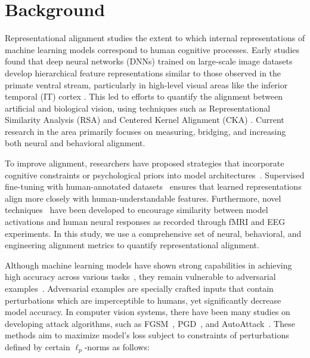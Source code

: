 \section{Background}\label{sec:background}
Representational alignment studies the extent to which internal representations of machine learning models correspond to human cognitive processes. 
Early studies found that deep neural networks (DNNs) trained on large-scale image datasets develop hierarchical feature representations similar to those observed in the primate ventral stream, particularly in high-level visual areas like the inferior temporal (IT) cortex \cite{yamins_hierarchical_2013, schrimpf_brain-score_2018}. This led to efforts to quantify the alignment between artificial and biological vision, using techniques such as Representational Similarity Analysis (RSA) \cite{kriegeskorte_representational_2008} and Centered Kernel Alignment (CKA) \cite{kornblith_similarity_2019}. Current research in the area primarily focuses on measuring, bridging, and increasing both neural and behavioral alignment. 



To improve alignment, researchers have proposed strategies that incorporate cognitive constraints or psychological priors into model architectures~\cite{dapello_simulating_2020}. Supervised fine-tuning with human-annotated datasets~\cite{dosovitskiy_image_2021} ensures that learned representations align more closely with human-understandable features. Furthermore, novel techniques~\cite{muttenthaler_improving_2023,li_learning_2019,cheng_rtify_2024} have been developed to encourage similarity between model activations and human neural responses as recorded through fMRI and EEG experiments. In this study, we use a comprehensive set of neural, behavioral, and engineering alignment metrics to quantify representational alignment. 
  


Although machine learning models have shown strong capabilities in achieving high accuracy across various tasks~\cite{liu_convnet_2022, dosovitskiy_image_2021, krizhevsky_imagenet_2017, he_deep_2016}, they remain vulnerable to adversarial examples~\cite{croce_reliable_2020,madry_towards_2019, carlini_towards_2017,goodfellow_explaining_2015, sheatsley_space_2023}. Adversarial examples are specially crafted inputs that contain perturbations which are imperceptible to humans, yet significantly decrease model accuracy. In computer vision systems, there have been many studies on developing attack algorithms, such as FGSM~\cite{goodfellow_explaining_2015}, PGD~\cite{madry_towards_2019}, and AutoAttack~\cite{croce_reliable_2020}. These methods  aim to maximize model's loss subject to constraints of perturbations defined by certain $\ell_p$-norms as follows:


